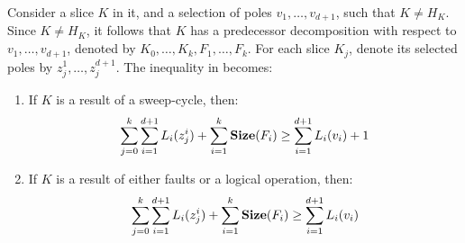   \begin{corollary}
    \label{claim:shrinkslice}
Consider a slice $K$ in it, and a selection of poles $v_{1}, \ldots, v_{d+1}$, such that $K \neq H_{K}$. Since $K \neq H_{K}$, it follows that $K$ has a predecessor decomposition with respect to $v_{1}, \ldots, v_{d+1}$, denoted by $K_{0}, \ldots, K_{k}, F_{1}, \ldots, F_{k}$. For each slice $K_{j}$, denote its selected poles by $z_{j}^{1}, \ldots, z_{j}^{d+1}$. The inequality in  becomes:
    \begin{enumerate}
      \item If $K$ is a result of a sweep-cycle, then:
        \begin{equation*}
          \begin{split}
            \sum_{j=0}^{k}\sum_{i=1}^{d+1} L_{i}(z_{j}^{i}) +  \sum^{k}_{i=1}\mathbf{Size}(F_{i}) \ge \sum_{i=1}^{d+1}L_{i}(v_i) + 1
          \end{split}
        \end{equation*}
          \item If $K$ is a result of either faults or a logical operation, then: 
        \begin{equation*}
          \begin{split}
            \sum_{j=0}^{k}\sum_{i=1}^{d+1} L_{i}(z_{j}^{i}) +  \sum^{k}_{i=1}\mathbf{Size}(F_{i}) \ge \sum_{i=1}^{d+1}L_{i}(v_i)   
          \end{split}
        \end{equation*}
      \end{enumerate}
  \end{corollary}
